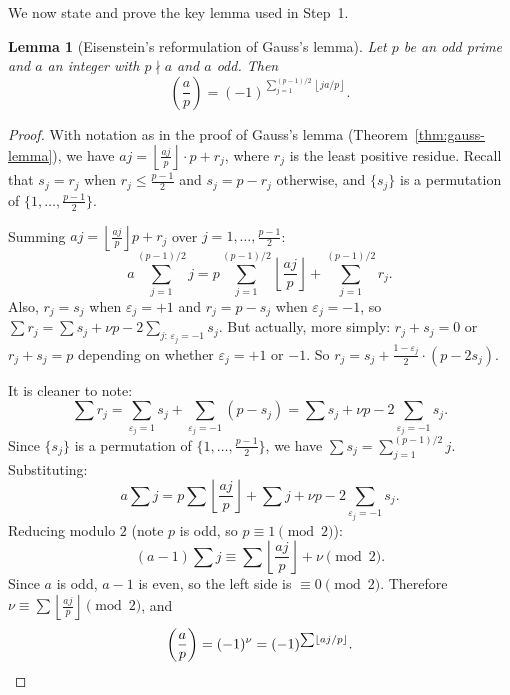 \documentclass[12pt,a4paper,openany]{book}
\theoremstyle{definition}
\theoremstyle{plain}
\newtheorem{lemma}[definition]{Lemma}
\theoremstyle{remark}
\newcommand{\floor}[1]{\left\lfloor #1 \right\rfloor}
\newcommand{\legendre}[2]{\left(\frac{#1}{#2}\right)}
\begin{document}
We now state and prove the key lemma used in Step~1.

\begin{lemma}[Eisenstein's reformulation of Gauss's lemma]
\label{lem:eisenstein-key}
Let $p$ be an odd prime and $a$ an integer with $p \nmid a$ and $a$ odd. Then
\[
  \legendre{a}{p} = (-1)^{\sum_{j=1}^{(p-1)/2} \floor{ja/p}}.
\]
\end{lemma}

\begin{proof}
With notation as in the proof of Gauss's lemma (Theorem~\ref{thm:gauss-lemma}),
we have $aj = \floor{\frac{aj}{p}} \cdot p + r_j$, where $r_j$ is the least
positive residue. Recall that $s_j = r_j$ when $r_j \leq \frac{p-1}{2}$ and
$s_j = p - r_j$ otherwise, and $\{s_j\}$ is a permutation of
$\{1, \ldots, \frac{p-1}{2}\}$.

Summing $aj = \floor{\frac{aj}{p}} p + r_j$ over $j = 1, \ldots, \frac{p-1}{2}$:
\[
  a \sum_{j=1}^{(p-1)/2} j = p \sum_{j=1}^{(p-1)/2} \floor{\frac{aj}{p}}
    + \sum_{j=1}^{(p-1)/2} r_j.
\]
Also, $r_j = s_j$ when $\varepsilon_j = +1$ and $r_j = p - s_j$ when $\varepsilon_j = -1$,
so $\sum r_j = \sum s_j + \nu p - 2 \sum_{j:\, \varepsilon_j = -1} s_j$. But actually,
more simply: $r_j + s_j = 0$ or $r_j + s_j = p$ depending on whether $\varepsilon_j = +1$ or $-1$.
So $r_j = s_j + \frac{1 - \varepsilon_j}{2} \cdot (p - 2s_j)$.

It is cleaner to note:
\[
  \sum r_j = \sum_{\varepsilon_j = 1} s_j + \sum_{\varepsilon_j = -1} (p - s_j)
  = \sum s_j + \nu p - 2\!\!\sum_{\varepsilon_j = -1}\!\! s_j.
\]
Since $\{s_j\}$ is a permutation of $\{1, \ldots, \frac{p-1}{2}\}$,
we have $\sum s_j = \sum_{j=1}^{(p-1)/2} j$. Substituting:
\[
  a \sum j = p \sum \floor{\frac{aj}{p}} + \sum j + \nu p
  - 2\!\!\sum_{\varepsilon_j = -1}\!\! s_j.
\]
Reducing modulo $2$ (note $p$ is odd, so $p \equiv 1 \pmod{2}$):
\[
  (a-1)\sum j \equiv \sum \floor{\frac{aj}{p}} + \nu \pmod{2}.
\]
Since $a$ is odd, $a - 1$ is even, so the left side is $\equiv 0 \pmod{2}$.
Therefore $\nu \equiv \sum \floor{\frac{aj}{p}} \pmod{2}$, and
\[
  \legendre{a}{p} = (-1)^\nu = (-1)^{\sum \floor{aj/p}}. \qedhere
\]
\end{proof}
\end{document}

